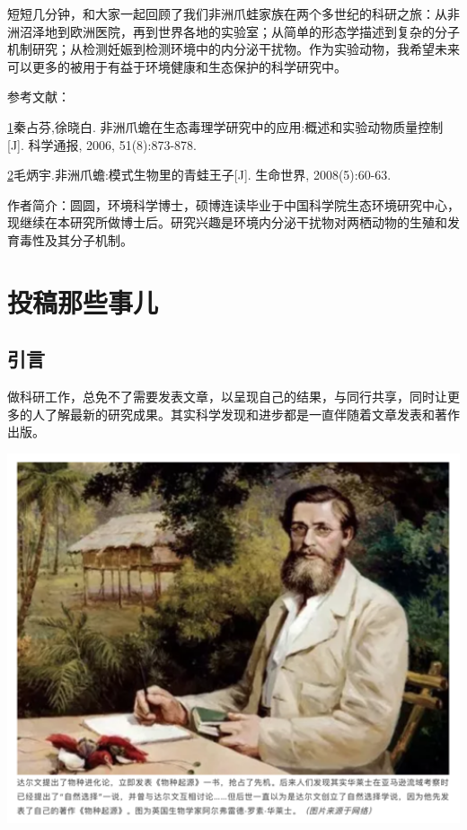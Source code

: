 \documentclass[]{book}
\begin{document}
短短几分钟，和大家一起回顾了我们非洲爪蛙家族在两个多世纪的科研之旅：从非洲沼泽地到欧洲医院，再到世界各地的实验室；从简单的形态学描述到复杂的分子机制研究；从检测妊娠到检测环境中的内分泌干扰物。作为实验动物，我希望未来可以更多的被用于有益于环境健康和生态保护的科学研究中。

参考文献：

\href{陈心想，耿增超。西北农林科技大学学报（自然科学版），2013，41:\%20167-174．}{1}秦占芬,徐晓白.
非洲爪蟾在生态毒理学研究中的应用:概述和实验动物质量控制{[}J{]}.
科学通报, 2006, 51(8):873-878.

\href{Kezhen\%20Qian,\%20Ajay\%20Kumar,\%20et.al.\%20Renew.\%20and\%20Sustain.\%20Energy\%20Reviews,\%202015,\%2042:\%201055-1064.}{2}毛炳宇.非洲爪蟾:模式生物里的青蛙王子{[}J{]}.
生命世界, 2008(5):60-63.

作者简介：圆圆，环境科学博士，硕博连读毕业于中国科学院生态环境研究中心，现继续在本研究所做博士后。研究兴趣是环境内分泌干扰物对两栖动物的生殖和发育毒性及其分子机制。

\section{投稿那些事儿}

\subsection{引言}\label{-1}

做科研工作，总免不了需要发表文章，以呈现自己的结果，与同行共享，同时让更多的人了解最新的研究成果。其实科学发现和进步都是一直伴随着文章发表和著作出版。

\includegraphics[width=6.67in]{images/tougao1}
\end{document}

